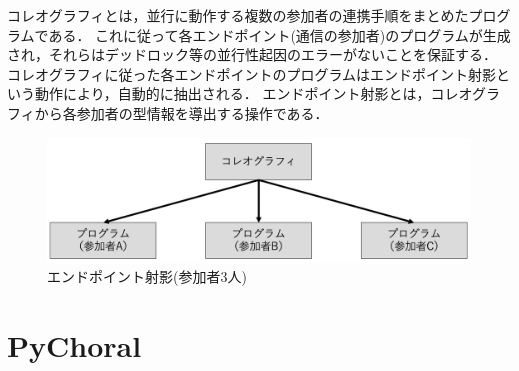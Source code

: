 \documentclass{resume}
\begin{document}
コレオグラフィとは，並行に動作する複数の参加者の連携手順をまとめたプログラムである．
これに従って各エンドポイント(通信の参加者)のプログラムが生成され，それらはデッドロック等の並行性起因のエラーがないことを保証する．
コレオグラフィに従った各エンドポイントのプログラムはエンドポイント射影\cite{endpoint}という動作により，自動的に抽出される．
エンドポイント射影とは，コレオグラフィから各参加者の型情報を導出する操作である．
\vspace*{-7pt}
\begin{figure}[H]
  \centering
  \includegraphics[scale=0.3]{image/epp.png}
  \caption{エンドポイント射影(参加者3人)}
\end{figure}
\vspace*{-15pt}
\section{PyChoral}
\end{document}

